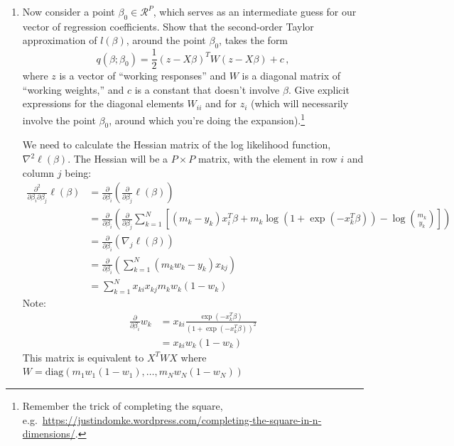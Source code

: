 \documentclass{article}
\begin{document}
\begin{enumerate}[label=(\Alph*)]
\item Now consider a point $\beta_0 \in \mathcal{R}^P$, which serves as an intermediate guess for our vector of regression coefficients.  Show that the second-order Taylor approximation of $l(\beta)$, around the point $\beta_0$, takes the form
$$
q(\beta; \beta_0) = \frac{1}{2}(z - X \beta)^T W (z - X \beta) + c\, ,
$$
where $z$ is a vector of ``working responses'' and $W$ is a diagonal matrix of ``working weights,'' and $c$ is a constant that doesn't involve $\beta$.  Give explicit expressions for the diagonal elements $W_{ii}$ and for $z_i$ (which will necessarily involve the point $\beta_0$, around which you're doing the expansion).\footnote{Remember the trick of completing the square, e.g.~\url{https://justindomke.wordpress.com/completing-the-square-in-n-dimensions/}.}

{\color{blue}
We need to calculate the Hessian matrix of the log likelihood function, $\nabla^2 \ell(\beta) $. The Hessian will be a $P\times P$ matrix, with the element in row $i$ and column $j$ being:
	\begin{align}
		\frac{\partial^2}{\partial \beta_i \partial \beta _j}\ell (\beta) &= \frac{\partial}{\partial \beta_i} \left ( \frac{\partial}{\partial \beta_j} \ell (\beta) \right ) \\
		&= \frac{\partial}{\partial \beta_i} \left ( \frac{\partial}{\partial \beta_j} \sum_{k=1}^N \left [(m_k-y_k)x_i^T\beta +m_k\log(1+\exp(-x_k^T\beta)) - \log\binom {m_k}{y_k} \right ] \right ) \\
		&= \frac{\partial}{\partial \beta_i} \left ( \nabla_j \ell(\beta) \right ) \\
		&= \frac{\partial}{\partial \beta_i} \left ( \sum_{k=1}^N(m_kw_k-y_k)x_{kj} \right )  \\
		&= \sum_{k=1}^{N} x_{ki}x_{kj}m_k w_k(1-w_k)
	\end{align}
	Note: 
	\begin{align}
		\frac{\partial}{\partial \beta_i} w_k &= x_{ki} \frac{\exp(-x_k^T\beta)}{(1+\exp(-x_k^T\beta))^2} \\
		&= x_{ki} w_k(1-w_k)
	\end{align}
	This matrix is equivalent to $X^TWX$ where $W = \text{diag}(m_1w_1(1-w_1),\ldots, m_Nw_N(1-w_N))$ \\
	
}
\end{enumerate}
\end{document}
